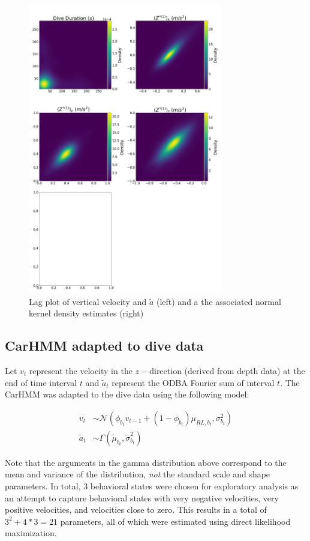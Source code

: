 \begin{figure}[h!]
	\centering
	\includegraphics[height=5in]{../Plots/lagplot.png}
	\caption{Lag plot of vertical velocity and $\tilde a$ (left) and a the associated normal kernel density estimates (right)}
	\label{fig:lag}
\end{figure}

\subsection{CarHMM adapted to dive data}

Let $v_t$ represent the velocity in the $z-$direction (derived from depth data) at the end of time interval $t$ and $\tilde a_t$ represent the ODBA Fourier sum of interval $t$. The CarHMM was adapted to the dive data using the following model:

\begin{align*}
	v_{t} &\sim \mathcal{N}\left(\phi_{b_t} v_{t-1} + (1-\phi_{b_t}) \mu_{RL,b_t}, \sigma_{b_t}^2\right) \\
	\tilde a_t &\sim \Gamma\left(\tilde \mu_{b_t}, \tilde \sigma^2_{b_t}\right)
\end{align*}

Note that the arguments in the gamma distribution above correspond to the mean and variance of the distribution, \textit{not} the standard scale and shape parameters. In total, 3 behavioral states were chosen for exploratory analysis as an attempt to capture behavioral states with very negative velocities, very positive velocities, and velocities close to zero. This results in a total of $3^2 + 4*3 = 21$ parameters, all of which were estimated using direct likelihood maximization.


